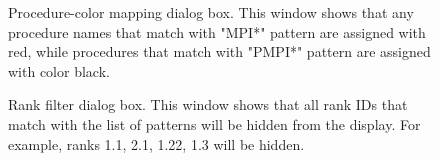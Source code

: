 
\begin{figure}[t]
\caption{Procedure-color mapping dialog box. This window shows that any procedure names that match with "MPI*" pattern are assigned with red, while procedures that match with "PMPI*" pattern are assigned with color black.}
\label{fig:hpctraceviewer-mapping}
\end{figure}

\begin{figure}[t]
\caption{Rank filter dialog box. This window shows that all rank IDs that match with the list of patterns will be hidden from the display. For example, ranks 1.1, 2.1, 1.22, 1.3 will be hidden.}
\label{fig:hpctraceviewer-filter}
\end{figure}


